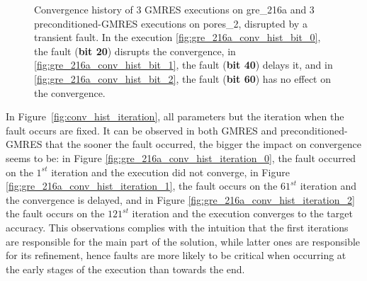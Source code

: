 \documentclass[twoside]{article}
\newcounter{fig}\setcounter{fig}{0}
\begin{document}
\begin{figure}[H]
\begin{minipage}[b]{0.48\linewidth}
      
    \end{minipage}
    \caption{Convergence history of 3 GMRES executions on gre_216a and 3 preconditioned-GMRES executions on pores_2, disrupted by a transient fault. In the execution \ref{fig:gre_216a_conv_hist_bit_0}, the fault (\textbf{bit 20}) disrupts the convergence, in \ref{fig:gre_216a_conv_hist_bit_1}, the fault (\textbf{bit 40}) delays it, and in \ref{fig:gre_216a_conv_hist_bit_2}, the fault (\textbf{bit 60}) has no effect on the convergence.}\label{fig:conv_hist_bit}
  \end{figure}



  In Figure~\ref{fig:conv_hist_iteration}, all parameters but the iteration when the fault occurs are fixed. It can be observed in both GMRES and preconditioned-GMRES that the sooner the fault occurred, the bigger the impact on convergence seems to be: in Figure \ref{fig:gre_216a_conv_hist_iteration_0}, the fault occurred on the $1^{st}$ iteration and the execution did not converge, in Figure \ref{fig:gre_216a_conv_hist_iteration_1}, the fault occurs on the $61^{st}$ iteration and the convergence is delayed, and in Figure \ref{fig:gre_216a_conv_hist_iteration_2} the fault occurs on the $121^{st}$ iteration and the execution converges to the target accuracy.
  This observations complies with the intuition that the first iterations are responsible for the main part of the solution, while latter ones are responsible for its refinement, hence faults are more likely to be critical when occurring at the early stages of the execution than towards the end.
\end{document}
